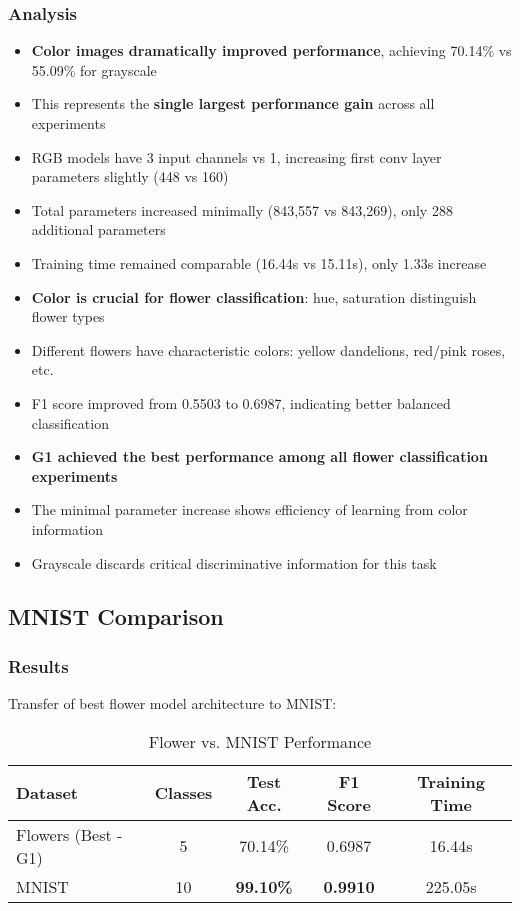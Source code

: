 \documentclass[12pt,a4paper]{article}
\begin{document}
\subsubsection{Analysis}
\begin{itemize}
    \item \textbf{Color images dramatically improved performance}, achieving 70.14\% vs 55.09\% for grayscale
    \item This represents the \textbf{single largest performance gain} across all experiments
    \item RGB models have 3 input channels vs 1, increasing first conv layer parameters slightly (448 vs 160)
    \item Total parameters increased minimally (843,557 vs 843,269), only 288 additional parameters
    \item Training time remained comparable (16.44s vs 15.11s), only 1.33s increase
    \item \textbf{Color is crucial for flower classification}: hue, saturation distinguish flower types
    \item Different flowers have characteristic colors: yellow dandelions, red/pink roses, etc.
    \item F1 score improved from 0.5503 to 0.6987, indicating better balanced classification
    \item \textbf{G1 achieved the best performance among all flower classification experiments}
    \item The minimal parameter increase shows efficiency of learning from color information
    \item Grayscale discards critical discriminative information for this task
\end{itemize}

\subsection{MNIST Comparison}

\subsubsection{Results}
Transfer of best flower model architecture to MNIST:

\begin{table}[H]
\centering
\caption{Flower vs. MNIST Performance}
\begin{tabular}{lcccc}
\toprule
\textbf{Dataset} & \textbf{Classes} & \textbf{Test Acc.} & \textbf{F1 Score} & \textbf{Training Time} \\
\midrule
Flowers (Best - G1) & 5 & 70.14\% & 0.6987 & 16.44s \\
MNIST & 10 & \textbf{99.10\%} & \textbf{0.9910} & 225.05s \\
\bottomrule
\end{tabular}
\end{table}
\end{document}
